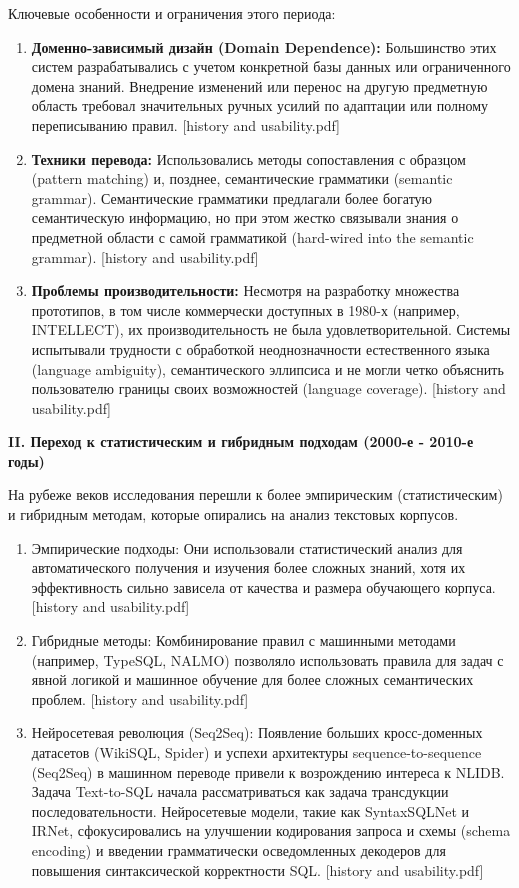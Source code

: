 Ключевые особенности и ограничения этого периода:

\begin{enumerate}
    \item \textbf{Доменно-зависимый дизайн (Domain Dependence):} Большинство этих систем разрабатывались с учетом конкретной базы данных или ограниченного домена знаний. Внедрение изменений или перенос на другую предметную область требовал значительных ручных усилий по адаптации или полному переписыванию правил. [history and usability.pdf]
    \item \textbf{Техники перевода:} Использовались методы сопоставления с образцом (pattern matching) и, позднее, семантические грамматики (semantic grammar). Семантические грамматики предлагали более богатую семантическую информацию, но при этом жестко связывали знания о предметной области с самой грамматикой (hard-wired into the semantic grammar). [history and usability.pdf]
    \item \textbf{Проблемы производительности:} Несмотря на разработку множества прототипов, в том числе коммерчески доступных в 1980-х (например, INTELLECT), их производительность не была удовлетворительной. Системы испытывали трудности с обработкой неоднозначности естественного языка (language ambiguity), семантического эллипсиса и не могли четко объяснить пользователю границы своих возможностей (language coverage). [history and usability.pdf]
\end{enumerate}

\textbf{II. Переход к статистическим и гибридным подходам (2000-е - 2010-е годы)}

На рубеже веков исследования перешли к более эмпирическим (статистическим) и гибридным методам, которые опирались на анализ текстовых корпусов.

\begin{enumerate}
    \item Эмпирические подходы: Они использовали статистический анализ для автоматического получения и изучения более сложных знаний, хотя их эффективность сильно зависела от качества и размера обучающего корпуса. [history and usability.pdf]
    \item Гибридные методы: Комбинирование правил с машинными методами (например, TypeSQL, NALMO) позволяло использовать правила для задач с явной логикой и машинное обучение для более сложных семантических проблем. [history and usability.pdf]
    \item Нейросетевая революция (Seq2Seq): Появление больших кросс-доменных датасетов (WikiSQL, Spider) и успехи архитектуры sequence-to-sequence (Seq2Seq) в машинном переводе привели к возрождению интереса к NLIDB. Задача Text-to-SQL начала рассматриваться как задача трансдукции последовательности. Нейросетевые модели, такие как SyntaxSQLNet и IRNet, сфокусировались на улучшении кодирования запроса и схемы (schema encoding) и введении грамматически осведомленных декодеров для повышения синтаксической корректности SQL. [history and usability.pdf]
\end{enumerate}

